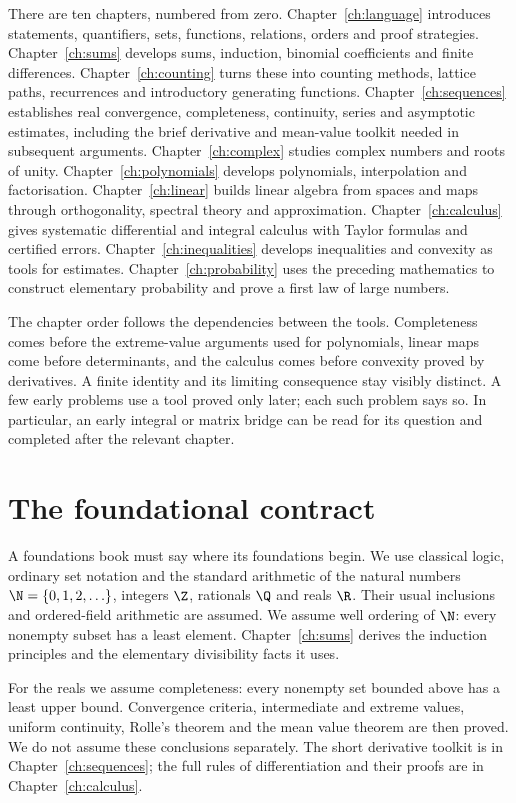 There are ten chapters, numbered from zero. Chapter~\ref{ch:language} introduces
statements, quantifiers, sets, functions, relations, orders and proof strategies.
Chapter~\ref{ch:sums} develops sums, induction, binomial coefficients and finite
differences. Chapter~\ref{ch:counting} turns these into counting methods, lattice
paths, recurrences and introductory generating functions.
Chapter~\ref{ch:sequences} establishes real convergence, completeness, continuity,
series and asymptotic estimates, including the brief derivative and mean-value
toolkit needed in subsequent arguments. Chapter~\ref{ch:complex} studies complex
numbers and roots of unity. Chapter~\ref{ch:polynomials} develops polynomials,
interpolation and factorisation. Chapter~\ref{ch:linear} builds linear algebra
from spaces and maps through orthogonality, spectral theory and approximation.
Chapter~\ref{ch:calculus} gives systematic differential and integral calculus with
Taylor formulas and certified errors. Chapter~\ref{ch:inequalities} develops
inequalities and convexity as tools for estimates. Chapter~\ref{ch:probability}
uses the preceding mathematics to construct elementary probability and prove a
first law of large numbers.

The chapter order follows the dependencies between the tools. Completeness
comes before the extreme-value arguments used for polynomials, linear maps
come before determinants, and the calculus comes before convexity proved by
derivatives. A finite identity and its limiting consequence stay visibly
distinct. A few early problems use a tool proved only later; each such
problem says so. In particular, an early integral or matrix bridge can be read
for its question and completed after the relevant chapter.

\section*{The foundational contract}
A foundations book must say where its foundations begin. We use classical logic,
ordinary set notation and the standard arithmetic of the natural numbers
$\N=\{0,1,2,\ldots\}$, integers $\Z$, rationals $\Q$ and reals $\R$. Their usual
inclusions and ordered-field arithmetic are assumed. We assume well ordering of
$\N$: every nonempty subset has a least element. Chapter~\ref{ch:sums} derives the
induction principles and the elementary divisibility facts it uses.

For the reals we assume completeness: every nonempty set bounded above has a
least upper bound. Convergence criteria, intermediate and extreme values,
uniform continuity, Rolle's theorem and the mean value theorem are then proved.
We do not assume these conclusions separately. The short derivative toolkit is
in Chapter~\ref{ch:sequences}; the full rules of differentiation and their proofs
are in Chapter~\ref{ch:calculus}.

